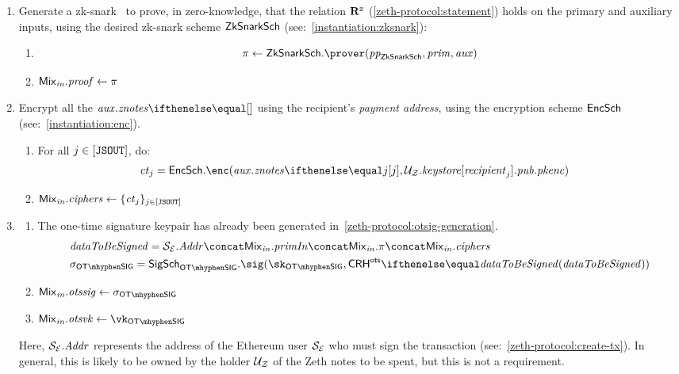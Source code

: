 \begin{enumerate}
\begin{notebox}
    \end{notebox}
\item Generate a zk-snark \zkp~to prove, in zero-knowledge, that the relation $\mathbf{R}^{\texttt{z}}$ (\cref{zeth-protocol:statement}) holds on the primary and auxiliary inputs, using the desired zk-snark scheme $\mathsf{ZkSnarkSch}$ (see:~\cref{instantiation:zksnark}):
    \begin{enumerate}
        \item
            \[
                \zkp \gets \zksnark.\prover(\pparams_{\zksnark}, \priminputs, \auxinputs)
            \]
        \item $\mathit{{\mathsf{Mix}}_{in}}.\mathit{proof} \gets \mathit{\pi}$
    \end{enumerate}

\item Encrypt all the $\auxinputs.\znotes{}$ using the recipient's \emph{payment address}, using the encryption scheme $\mathsf{EncSch}$ (see:~\cref{instantiation:enc}).
    \begin{enumerate}
        \item For all $j \in [\mathtt{JSOUT}]$, do:
        \begin{align*}
            & \ct_j = \encscheme.\enc(\auxinputs.\znotes{j}, \zparty{U}.\keystore[\varstyle{recipient}_j].\pubaddr.\pkenc)
        \end{align*}
        \item $\mathit{{\mathsf{Mix}}_{in}}.\mathit{ciphers} \gets \{{\mathit{ct}_j}\}_{j \in [\mathtt{JSOUT}]}$
    \end{enumerate}
\item {}
    \begin{enumerate}
        \item The one-time signature keypair has already been generated in~\cref{zeth-protocol:otsig-generation}.
            \begin{align*}
                & \datatobesigned = \eparty{S}.\addr \concat \inp{\mix}.\primInp \concat \inp{\mix}.\zkp \concat \inp{\mix}.\ciphers \\
                & \otsSigma = \otsigscheme.\sig(\sk_{\otsig}, \crhots{\datatobesigned})
            \end{align*}
        \item $\inp{\mix}.\otssig \gets \otsSigma$
        \item $\inp{\mix}.\otsvk \gets \vk_{\otsig}$
    \end{enumerate}
    Here, $\mathcal{{S}_{E}}.\mathit{Addr}$ represents the address of the Ethereum user $\mathcal{{S}_{E}}$ who must sign the transaction (see:~\cref{zeth-protocol:create-tx}). In general, this is likely to be owned by the holder $\mathcal{{U}_{Z}}$ of the Zeth notes to be spent, but this is not a requirement.
\end{enumerate}
